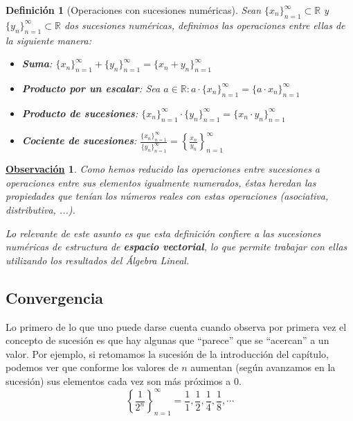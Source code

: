 \documentclass[10pt,a4paper,openright]{book}
\theoremstyle{break}
\newtheorem{defi}{Definición}[chapter]
\newtheorem{obs}{\underline{Observación}}[chapter]
\begin{document}
\begin{defi}[Operaciones con sucesiones numéricas]
Sean $\{x_n\}_{n=1}^{\infty}\subset \mathbb R$ y $\{y_n\}_{n=1}^{\infty}\subset \mathbb R$ dos sucesiones numéricas, definimos las operaciones entre ellas de la siguiente manera:
\begin{itemize}
\item \textbf{Suma}: $\{x_n\}_{n=1}^{\infty}+\{y_n\}_{n=1}^{\infty}=\{x_n+y_n\}_{n=1}^{\infty}$

\item \textbf{Producto por un escalar}: Sea $a\in \mathbb R: a\cdot \{x_n\}_{n=1}^{\infty}=\{a\cdot x_n\}_{n=1}^{\infty}$

\item \textbf{Producto de sucesiones}: $\{x_n\}_{n=1}^{\infty}\cdot \{y_n\}_{n=1}^{\infty}=\{x_n\cdot y_n\}_{n=1}^{\infty}$

\item \textbf{Cociente de sucesiones}: $\frac{\{x_n\}_{n=1}^{\infty}}{\{y_n\}_{n=1}^{\infty}}=\left\lbrace\frac{x_n}{y_n}\right\rbrace_{n=1}^{\infty}$
\end{itemize}
\end{defi}

\begin{obs}
Como hemos reducido las operaciones entre sucesiones a operaciones entre sus elementos igualmente numerados, éstas heredan las propiedades que tenían los números reales con estas operaciones (asociativa, distributiva, ...).

Lo relevante de este asunto es que esta definición confiere a las sucesiones numéricas de estructura de \textbf{espacio vectorial}, lo que permite trabajar con ellas utilizando los resultados del Álgebra Lineal.
\end{obs}

\subsection{Convergencia}
\label{subsec:convergencia}

Lo primero de lo que uno puede darse cuenta cuando observa por primera vez el concepto de sucesión es que hay algunas que ``parece'' que se ``acercan'' a un valor. Por ejemplo, si retomamos la sucesión de la introducción del capítulo, podemos ver que conforme los valores de $n$ aumentan (según avanzamos en la sucesión) sus elementos cada vez son más próximos a 0.
\[
\left\lbrace\frac{1}{2^n}\right\rbrace_{n=1}^{\infty} = \frac{1}{1}, \frac{1}{2}, \frac{1}{4}, \frac{1}{8}, \cdots
\]
\end{document}
